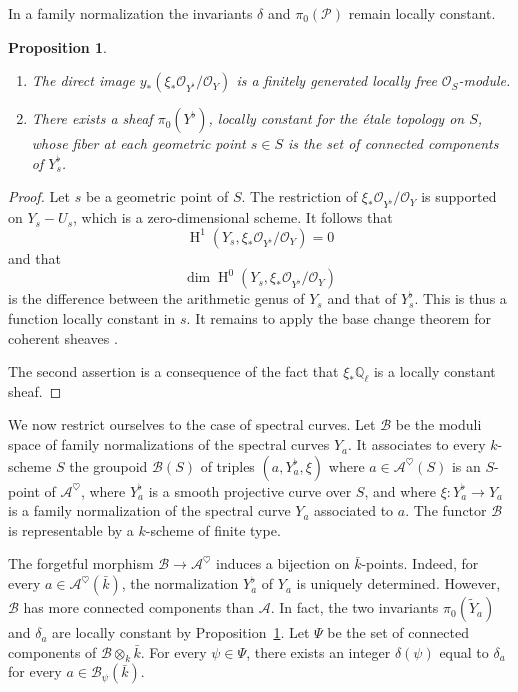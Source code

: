 \documentclass[12pt,english]{smfart}
\numberwithin{equation}{subsection}
\newtheorem{proposition}[equation]{Proposition}
\theoremstyle{remark}
\begin{document}
In a family normalization the invariants $\delta$ and $\pi_0(\mathcal{P})$ remain locally constant.

\begin{proposition}\label{localement constant}
\begin{enumerate}
  \item The direct image $y_*(\xi_*\mathcal{O}_{Y^\flat}/\mathcal{O}_Y)$ is a finitely generated locally free $\mathcal{O}_S$-module.
  \item There exists a sheaf $\pi_0(Y^\flat)$, locally constant for the \'etale topology on $S$, whose fiber at each geometric point $s\in S$ is the set of connected components of $Y^\flat_s$.
\end{enumerate}
\end{proposition}

\begin{proof}
Let $s$ be a geometric point of $S$. The restriction of $\xi_*\mathcal{O}_{Y^\flat}/\mathcal{O}_Y$ is supported on $Y_s-U_s$, which is a zero-dimensional scheme. It follows that
$$\operatorname{H}^1(Y_s,\xi_*\mathcal{O}_{Y^\flat}/\mathcal{O}_Y)=0$$
and that 
$$\dim \operatorname{H}^0(Y_s,\xi_*\mathcal{O}_{Y^\flat}/\mathcal{O}_Y)$$ 
is the difference between the arithmetic genus of $Y_s$ and that of $Y_s^\flat$. This is thus a function locally constant in $s$. It remains to apply the base change theorem for coherent sheaves \cite[5, Corollary 2]{Mum}.

The second assertion is a consequence of the fact that $\xi_*\mathbb{Q}_\ell$ is a locally constant sheaf.
\end{proof}

We now restrict ourselves to the case of spectral curves. Let $\mathcal{B}$ be the moduli space of family normalizations of the spectral curves $Y_a$. It associates to every $k$-scheme $S$ the groupoid $\mathcal{B}(S)$ of triples $(a,Y_a^\flat,\xi)$ where $a\in \mathcal{A}^\heartsuit(S)$ is an $S$-point of $\mathcal{A}^\heartsuit$, where $Y_a^\flat$ is a smooth projective curve over $S$, and where $\xi:Y_a^\flat\rightarrow Y_a$ is a family normalization of the spectral curve $Y_a$ associated to $a$. The functor $\mathcal{B}$ is representable by a $k$-scheme of finite type.

The forgetful morphism $\mathcal{B}\rightarrow\mathcal{A}^\heartsuit$ induces a bijection on $\bar{k}$-points. Indeed, for every $a\in \mathcal{A}^\heartsuit(\bar{k})$, the normalization $Y_a^\flat$ of $Y_a$ is uniquely determined. However, $\mathcal{B}$ has more connected components than $\mathcal{A}$. In fact, the two invariants $\pi_0(\widetilde Y_a)$ and $\delta_a$ are locally constant by Proposition~\ref{localement constant}. Let $\Psi$ be the set of connected components of $\mathcal{B}\otimes_k \bar{k}$. For every $\psi\in \Psi$, there exists an integer $\delta(\psi)$ equal to $\delta_a$ for every $a\in\mathcal{B}_\psi(\bar{k})$.
\end{document}
